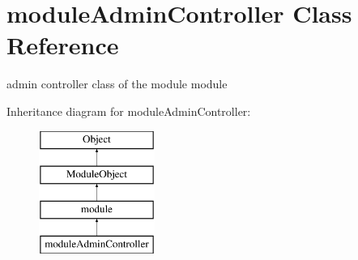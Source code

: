 \hypertarget{classmoduleAdminController}{\section{module\-Admin\-Controller Class Reference}
\label{classmoduleAdminController}
}


admin controller class of the module module  


Inheritance diagram for module\-Admin\-Controller\-:\begin{figure}[H]
\begin{center}
\leavevmode
\includegraphics[height=4.000000cm]{classmoduleAdminController}
\end{center}
\end{figure}
